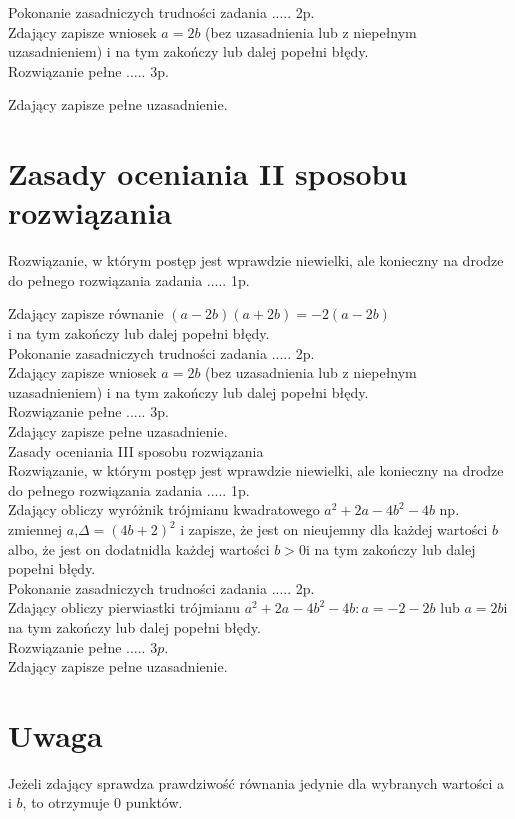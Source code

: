 \documentclass[10pt]{article}
\begin{document}
Pokonanie zasadniczych trudności zadania ..... 2p.\\
Zdający zapisze wniosek $a=2 b$ (bez uzasadnienia lub z niepełnym uzasadnieniem) i na tym zakończy lub dalej popełni błędy.\\
Rozwiązanie pełne ..... 3p.

Zdający zapisze pełne uzasadnienie.

\section*{Zasady oceniania II sposobu rozwiązania}
Rozwiązanie, w którym postęp jest wprawdzie niewielki, ale konieczny na drodze do pełnego rozwiązania zadania ..... 1p.

Zdający zapisze równanie $(a-2 b)(a+2 b)=-2(a-2 b)$\\
i na tym zakończy lub dalej popełni błędy.\\
Pokonanie zasadniczych trudności zadania ..... 2p.\\
Zdający zapisze wniosek $a=2 b$ (bez uzasadnienia lub z niepełnym uzasadnieniem) i na tym zakończy lub dalej popełni błędy.\\
Rozwiązanie pełne ..... 3p.\\
Zdający zapisze pełne uzasadnienie.\\
Zasady oceniania III sposobu rozwiązania\\
Rozwiązanie, w którym postęp jest wprawdzie niewielki, ale konieczny na drodze do pełnego rozwiązania zadania ..... 1p.\\
Zdający obliczy wyróżnik trójmianu kwadratowego $a^{2}+2 a-4 b^{2}-4 b$ np. zmiennej $a$,$\Delta=(4 b+2)^{2}$ i zapisze, że jest on nieujemny dla każdej wartości $b$ albo, że jest on dodatnidla każdej wartości $b>0$i na tym zakończy lub dalej popełni błędy.\\
Pokonanie zasadniczych trudności zadania ..... 2p.\\
Zdający obliczy pierwiastki trójmianu $a^{2}+2 a-4 b^{2}-4 b: a=-2-2 b$ lub $a=2 b$i na tym zakończy lub dalej popełni błędy.\\
Rozwiązanie pełne ..... $3 p$.\\
Zdający zapisze pełne uzasadnienie.

\section*{Uwaga}
Jeżeli zdający sprawdza prawdziwość równania jedynie dla wybranych wartości a i $b$, to otrzymuje 0 punktów.
\end{document}
